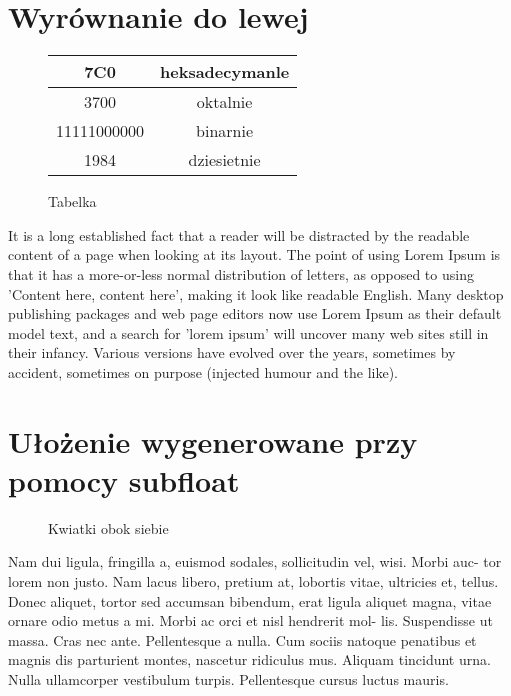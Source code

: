 \documentclass[a4paper,12pt]{article}
\begin{document}
	\newpage
	
	
	\section{Wyrównanie do lewej}
	\begin{wrapfigure}{l}{0.5\textwidth}
		\begin{tabular}{ |c|c| }
			\hline
			\multirow{1}{7em}{7C0} & heksadecymanle \\ 
			\hline
			\multirow{1}{7em}{3700} & oktalnie  \\ 
			\hline	
			\multirow{1}{7em}{11111000000} & 	binarnie \\
			\hline
			\hline
			\multirow{1}{7em}{1984} & dziesietnie \\	
			\hline
		\end{tabular}
		\caption{Tabelka}
	\end{wrapfigure}
	It is a long established fact that a reader will be distracted by the readable content of a page when looking at its layout. The point of using Lorem Ipsum is that it has a more-or-less normal distribution of letters, as opposed to using 'Content here, content here', making it look like readable English. Many desktop publishing packages and web page editors now use Lorem Ipsum as their default model text, and a search for 'lorem ipsum' will uncover many web sites still in their infancy. Various versions have evolved over the years, sometimes by accident, sometimes on purpose (injected humour and the like).
	
	\newpage
	
	
	\section{Ułożenie wygenerowane przy pomocy subfloat}
	\begin{figure}
		\centering
		\caption{Kwiatki obok siebie}
	\end{figure}
	Nam dui ligula, fringilla a, euismod sodales, sollicitudin vel, wisi. Morbi auc-
	tor lorem non justo. Nam lacus libero, pretium at, lobortis vitae, ultricies
	et, tellus. Donec aliquet, tortor sed accumsan bibendum, erat ligula aliquet
	magna, vitae ornare odio metus a mi. Morbi ac orci et nisl hendrerit mol-
	lis. Suspendisse ut massa. Cras nec ante. Pellentesque a nulla. Cum sociis
	natoque penatibus et magnis dis parturient montes, nascetur ridiculus mus.
	Aliquam tincidunt urna. Nulla ullamcorper vestibulum turpis. Pellentesque
	cursus luctus mauris.
	
\end{document}
